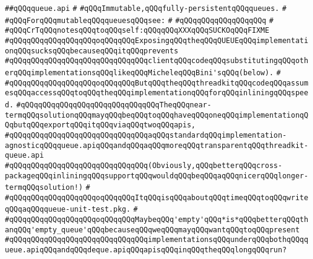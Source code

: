 \label{src/lib/src/queue.api}
\verb|##qQQqqueue.api|\newline
\verb|#|\newline
\verb|#qQQqImmutable,qQQqfully-persistentqQQqqueues.|\newline
\verb|#|\newline
\verb|#qQQqForqQQqmutableqQQqqueuesqQQqsee:|\newline
\verb|#|\newline
\verb|#qQQqqQQqqQQqqQQqqQQq|\newline
\verb|#|\newline
\verb|#qQQqCrTqQQqnotesqQQqtoqQQqself:qQQqqQQqXXXqQQqSUCKOqQQqFIXME|\newline
\verb|#qQQqqQQqqQQqqQQqqQQqoqQQqqQQqExposingqQQqtheqQQqQUEUEqQQqimplementationqQQqsucksqQQqbecauseqQQqitqQQqprevents|\newline
\verb|#qQQqqQQqqQQqqQQqqQQqqQQqqQQqqQQqclientqQQqcodeqQQqsubstitutingqQQqotherqQQqimplementationsqQQqlikeqQQqMicheleqQQqBini'sqQQq(below).|\newline
\verb|#|\newline
\verb|#qQQqqQQqqQQqqQQqqQQqoqQQqqQQqButqQQqtheqQQqthreadkitqQQqcodeqQQqassumesqQQqaccessqQQqtoqQQqtheqQQqimplementationqQQqforqQQqinliningqQQqspeed.|\newline
\verb|#qQQqqQQqqQQqqQQqqQQqqQQqqQQqqQQqTheqQQqnear-termqQQqsolutionqQQqmayqQQqbeqQQqtoqQQqhaveqQQqoneqQQqimplementationqQQqbutqQQqexportqQQqitqQQqviaqQQqtwoqQQqapis,|\newline
\verb|#qQQqqQQqqQQqqQQqqQQqqQQqqQQqqQQqaqQQqstandardqQQqimplementation-agnosticqQQqqueue.apiqQQqandqQQqaqQQqmoreqQQqtransparentqQQqthreadkit-queue.api|\newline
\verb|#qQQqqQQqqQQqqQQqqQQqqQQqqQQqqQQq(Obviously,qQQqbetterqQQqcross-packageqQQqinliningqQQqsupportqQQqwouldqQQqbeqQQqaqQQqnicerqQQqlonger-termqQQqsolution!)|\newline
\verb|#|\newline
\verb|#qQQqqQQqqQQqqQQqqQQqoqQQqqQQqItqQQqisqQQqaboutqQQqtimeqQQqtoqQQqwriteqQQqaqQQqqueue-unit-test.pkg.|\newline
\verb|#|\newline
\verb|#qQQqqQQqqQQqqQQqqQQqoqQQqqQQqMaybeqQQq'empty'qQQq*is*qQQqbetterqQQqthanqQQq'empty_queue'qQQqbecauseqQQqweqQQqmayqQQqwantqQQqtoqQQqpresent|\newline
\verb|#qQQqqQQqqQQqqQQqqQQqqQQqqQQqqQQqimplementationsqQQqunderqQQqbothqQQqqueue.apiqQQqandqQQqdeque.apiqQQqapisqQQqinqQQqtheqQQqlongqQQqrun?|\newline
